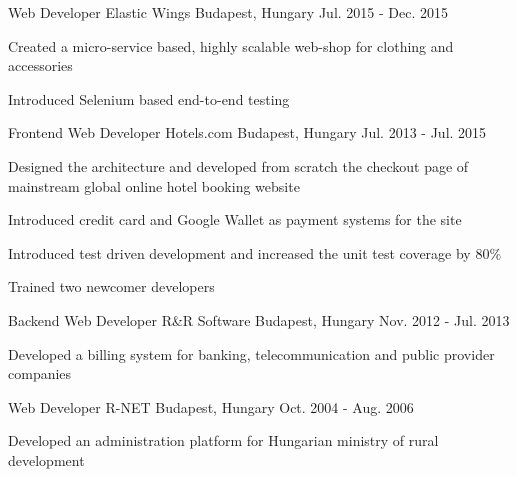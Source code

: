 \begin{cventries}
  \cventry
    {Web Developer} %
    {Elastic Wings} %
    {Budapest, Hungary} %
    {Jul. 2015 - Dec. 2015} %
    {
      \begin{cvitems} %
        \item {Created a micro-service based, highly scalable web-shop for clothing and accessories}
        \item {Introduced Selenium based end-to-end testing}
      \end{cvitems}
    }

  \cventry
    {Frontend Web Developer} %
    {Hotels.com} %
    {Budapest, Hungary} %
    {Jul. 2013 - Jul. 2015} %
    {
      \begin{cvitems} %
        \item {Designed the architecture and developed from scratch the checkout page of mainstream global online hotel booking website}
        \item {Introduced credit card and Google Wallet as payment systems for the site}
        \item {Introduced test driven development and increased the unit test coverage by 80\%}
        \item {Trained two newcomer developers}
      \end{cvitems}
    }

  \cventry
    {Backend Web Developer} %
    {R\&R Software} %
    {Budapest, Hungary} %
    {Nov. 2012 - Jul. 2013} %
    {
      \begin{cvitems} %
        \item {Developed a billing system for banking, telecommunication and public provider companies}
      \end{cvitems}
    }
  \cventry
    {Web Developer} %
    {R-NET} %
    {Budapest, Hungary} %
    {Oct. 2004 - Aug. 2006} %
    {
      \begin{cvitems} %
        \item {Developed an administration platform for Hungarian ministry of rural development}
      \end{cvitems}
    }

\end{cventries}
